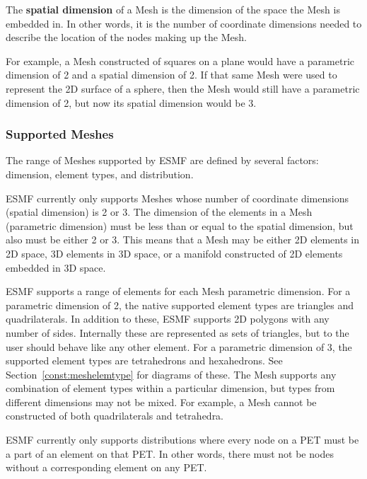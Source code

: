 The {\bf spatial dimension} of a Mesh is the dimension of the space the Mesh is embedded in. In other words, it is the number of coordinate dimensions needed to describe the location of the nodes making up the Mesh. 

For example, a Mesh constructed of squares on a plane would have a parametric dimension of 2 and a spatial dimension of 2. 
If that same Mesh were used to represent the 2D surface of a sphere, then the Mesh would still have a parametric dimension 
of 2, but now its spatial dimension would be 3. 

\subsubsection{Supported Meshes}

The range of Meshes supported by ESMF are defined by several factors: dimension, element 
types, and distribution.

ESMF currently only supports Meshes whose number of coordinate dimensions (spatial dimension) 
is 2 or 3. The dimension of the elements in a Mesh (parametric dimension) must be less than 
or equal to the spatial dimension, but also must be either 2 or 3. This means that a Mesh may 
be either 2D elements in 2D space, 3D elements in 3D space, or a manifold constructed of 2D 
elements embedded in 3D space. 

ESMF supports a range of elements for each Mesh parametric dimension. For a 
parametric dimension of 2, the native supported element types are triangles and quadrilaterals.
In addition to these, ESMF supports 2D polygons with any number of sides. Internally these
are represented as sets of triangles, but to the user should behave like any other element. 
For a parametric dimension of 3, the supported element types are tetrahedrons
and hexahedrons. See Section~\ref{const:meshelemtype} for diagrams of these. The Mesh 
supports any combination of element types within a particular dimension, but types from 
different dimensions may not be mixed.  For example, a Mesh cannot be constructed of both 
quadrilaterals and tetrahedra.

ESMF currently only supports distributions where every node on a PET must be a part of an 
element on that PET. In other words, there must not be nodes without a corresponding element 
on any PET.
